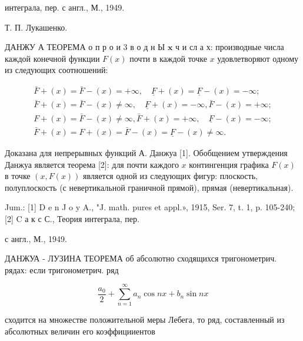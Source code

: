 \documentclass[10pt]{article}
\begin{document}
интеграла, пер. с англ., М., 1949.

Т. П. Лукашенко.



ДАНЖУ А ТЕОРЕМА о п р о и 3 в о д н Ы $\mathbf{x}$ ч и сл а х: производные числа каждой конечной функции $F(x)$ почти в каждой точке $x$ удовлетворяют одному из следующих соотношений:



\[

\begin{gathered}

\bar{F}+(x)=\bar{F}-(x)=+\infty, \quad \underline{F}+(x)=\underline{F}-(x)=-\infty ; \\

\bar{F}+(x)=\bar{F}-(x) \neq \infty, \quad \underline{F}+(x)=-\infty, \bar{F}-(x)=+\infty ; \\

F+(x)=\bar{F}-(x) \neq \infty, \bar{F}+(x)=+\infty, \quad \underline{F}-(x)=-\infty ; \\

\bar{F}+(x)=F+(x)=\bar{F}-(x)=\underline{F}-(x) \neq \infty .

\end{gathered}

\]



Доказана для непрерывных функций А. Данжуа [1]. Обобщением утверждения Данжуа является теорема [2]: для почти каждого $x$ контингенция графика $F(x)$ в точке $(x, F(x))$ является одной из следующих фигур: плоскость, полуплоскость (с невертикальной граничной прямой), прямая (невертикальная).



Jum.: [1] D e n J o y A., "J. math. pures et appl.», 1915, Ser. 7, t. 1, p. 105-240; [2] C а к с С., Теория интеграла, пер.

с англ., М., 1949.



ДАНЖУА - ЛУЗИНА ТЕОРЕМА об абсолютно сходящихся тригонометрич. рядах: если тригонометрич. ряд



\[

\frac{a_{0}}{2}+\sum_{n=1}^{\infty} a_{n} \cos n x+b_{n} \sin n x

\]



сходится на множестве положительной меры Лебега, то ряд, составленный из абсолютных величин его коэффицииентов
\end{document}
